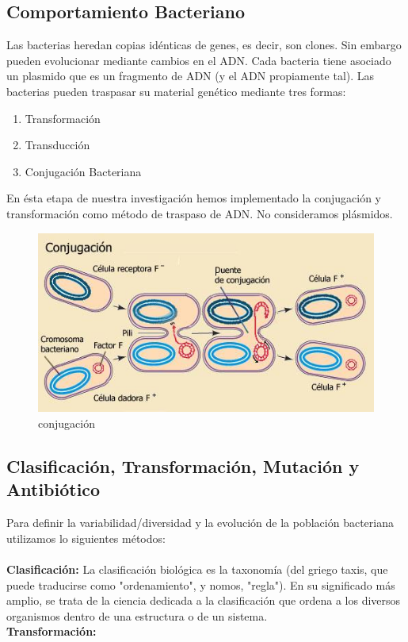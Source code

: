\documentclass[DIV=calc, paper=a4, fontsize=11pt, twocolumn]{scrartcl}	 %
\begin{document}
\subsection*{Comportamiento Bacteriano}
Las bacterias heredan copias idénticas de genes, es decir, son clones. Sin embargo pueden evolucionar mediante cambios en el ADN. Cada bacteria tiene asociado un plasmido que es un fragmento de ADN (y el ADN propiamente tal).
Las bacterias pueden traspasar su material genético mediante tres formas:
\begin{enumerate}
\item Transformación
\item Transducción
\item Conjugación Bacteriana
\end{enumerate}
En ésta etapa de nuestra investigación hemos implementado la conjugación y transformación como método de traspaso de ADN. No consideramos plásmidos.
\begin{figure}[htp]
\centering
\includegraphics[scale=0.40]{1.png}
\caption{conjugación}
\label{con}
\end{figure}

\subsection*{Clasificación, Transformación, Mutación y Antibiótico}
Para definir la variabilidad/diversidad y la evolución de la población bacteriana utilizamos lo siguientes métodos:\\\\\textbf{Clasificación: }La clasificación biológica es la taxonomía (del griego taxis, que puede traducirse como "ordenamiento", y nomos, "regla"). En su significado más amplio, se trata de la ciencia dedicada a la clasificación que ordena a los diversos organismos dentro de una estructura o de un sistema.\\\textbf{Transformación:} 
\end{document}
